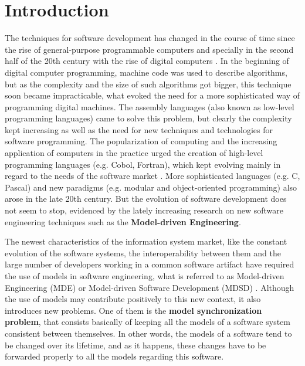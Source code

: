 \documentclass[tuberlin,cic,tc,english,noabntcite,oneside]{iiufrgs}
\begin{document}
\chapter{Introduction}
The techniques for software development has changed in the course of time since the rise of general-purpose programmable computers and specially in the second half of the 20th century with the rise of digital computers \citep{ceruzzi2003history}. In the beginning of digital computer programming, machine code was used to describe algorithms, but as the complexity and the size of such algorithms got bigger, this technique soon became impracticable, what evoked the need for a more sophisticated way of programming digital machines. The assembly languages (also known as low-level programming languages) came to solve this problem, but clearly the complexity kept increasing as well as the need for new techniques and technologies for software programming. The popularization of computing and the increasing application of computers in the practice urged the creation of high-level programming languages (e.g. Cobol, Fortran), which kept evolving mainly in regard to the needs of the software market \citep{ceruzzi2003history}. More sophisticated languages (e.g. C, Pascal) and new paradigms (e.g. modular and object-oriented programming) also arose in the late 20th century. But the evolution of software development does not seem to stop, evidenced by the lately increasing research on new software engineering techniques such as the \textbf{Model-driven Engineering}.

The newest characteristics of the information system market, like the constant evolution of the software systems, the interoperability between them and the large number of developers working in a common software artifact have required the use of models in software engineering, what is referred to as Model-driven Engineering (MDE) or Model-driven Software Development (MDSD) \citep{france2007model}. Although the use of models may contribute positively to this new context, it also introduces new problems. One of them is the \textbf{model synchronization problem}, that consists basically of keeping all the models of a software system consistent between themselves. In other words, the models of a software tend to be changed over its lifetime, and as it happens, these changes have to be forwarded properly to all the models regarding this software.

\end{document}
